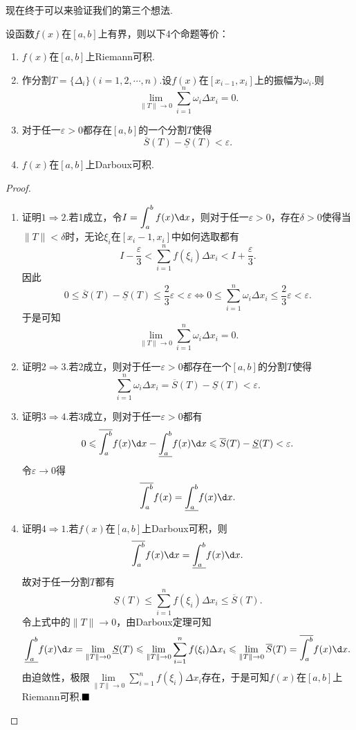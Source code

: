 现在终于可以来验证我们的第三个想法.
\begin{theorem}[Riemann可积的充要条件]
	设函数$f(x)$在$\left[a,b\right]$上有界，则以下4个命题等价：
	\begin{enumerate}
		\item $f(x)$在$\left[a,b\right]$上Riemann可积.
		\item 作分割$T=\{\Delta_i\}(i=1,2,\cdots,n)$.设$f(x)$在$\left[x_{i-1},x_i\right]$上的振幅为$\omega_i$.则
		$$\lim\limits_{\|T\|\to 0}\sum_{i=1}^{n}\omega_i\Delta x_i=0.$$
		\item 对于任一$\varepsilon>0$都存在$\left[a,b\right]$的一个分割$T$使得
		$$\overline{S}(T)-\underline{S}(T)<\varepsilon.$$
		\item $f(x)$在$\left[a,b\right]$上Darboux可积.
	\end{enumerate}
\end{theorem}
\begin{proof}
	\begin{enumerate}
		\item 证明$1\Rightarrow2$.若1成立，令$I=\displaystyle\int_{a}^{b}f(x)\d x$，则对于任一$\varepsilon>0$，存在$\delta>0$使得当$\|T\|<\delta$时，无论$\xi_i$在$\left[x_i-1,x_i\right]$中如何选取都有
		$$I-\frac{\varepsilon}{3}<\sum_{i=1}^{n}f(\xi_i)\Delta x_i<I+\frac{\varepsilon}{3}.$$
		因此
		$$0\leqslant\overline{S}(T)-\underline{S}(T)\leqslant\frac{2}{3}\varepsilon<\varepsilon\iff 0\leqslant\sum_{i=1}^{n}\omega_i\Delta x_i\leqslant\frac{2}{3}\varepsilon<\varepsilon.$$
		于是可知
		$$\lim\limits_{\|T\|\to 0}\sum_{i=1}^{n}\omega_i\Delta x_i=0.$$
		\item 证明$2\Rightarrow3$.若2成立，则对于任一$\varepsilon>0$都存在一个$\left[a,b\right]$的分割$T$使得
		$$\sum_{i=1}^{n}\omega_i\Delta x_i=\overline{S}(T)-\underline{S}(T)<\varepsilon.$$
		\item 证明$3\Rightarrow4$.若3成立，则对于任一$\varepsilon>0$都有
		$$0\leqslant\overline{\int_{a}^{b}}f(x)\d x-\underline{\int_{a}^{b}}f(x)\d x\leqslant\overline{S}(T)-\underline{S}(T)<\varepsilon.$$
		令$\varepsilon\to 0$得
		$$\overline{\int_{a}^{b}}f(x)=\underline{\int_{a}^{b}}f(x)\d x.$$
		\item 证明$4\Rightarrow1$.若$f(x)$在$\left[a,b\right]$上Darboux可积，则
		$$\overline{\int_{a}^{b}}f(x)\d x=\underline{\int_{a}^{b}}f(x)\d x.$$
		故对于任一分割$T$都有
		$$\underline{S}(T)\leqslant\sum_{i=1}^{n}f(\xi_i)\Delta x_i\leqslant\overline{S}(T).$$
		令上式中的$\|T\|\to 0$，由Darboux定理可知
		$$\underline{\int_{a}^{b}}f(x)\d x=\lim\limits_{\|T\|\to 0}\underline{S}(T)\leqslant\lim\limits_{\|T\|\to 0}\sum_{i=1}^{n}f(\xi_i)\Delta x_i\leqslant\lim\limits_{\|T\|\to 0}\overline{S}(T)=\overline{\int_{a}^{b}}f(x)\d x.$$
		由迫敛性，极限$\lim\limits_{\|T\|\to 0}\displaystyle\sum_{i=1}^{n}f(\xi_i)\Delta x_i$存在，于是可知$f(x)$在$\left[a,b\right]$上Riemann可积.$\hfill\blacksquare$
	\end{enumerate}
\end{proof}

